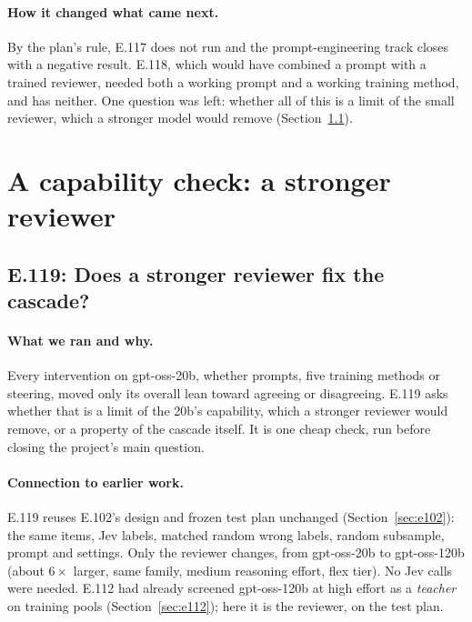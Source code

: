 \documentclass[11pt]{article}
\renewcommand{\_}{\origunderscore\allowbreak}
\begin{document}
\paragraph{How it changed what came next.}
By the plan's rule, E.117 does not run and the prompt-engineering track closes with a negative result. E.118, which would have combined a prompt with a trained reviewer, needed both a working prompt and a working training method, and has neither. One question was left: whether all of this is a limit of the small reviewer, which a stronger model would remove (Section~\ref{sec:e119}).

\section{A capability check: a stronger reviewer}\label{sec:capability}

\subsection{E.119: Does a stronger reviewer fix the cascade?}\label{sec:e119}

\paragraph{What we ran and why.}
Every intervention on gpt-oss-20b, whether prompts, five training methods or steering, moved only its overall lean toward agreeing or disagreeing. E.119 asks whether that is a limit of the 20b's capability, which a stronger reviewer would remove, or a property of the cascade itself. It is one cheap check, run before closing the project's main question.

\paragraph{Connection to earlier work.}
E.119 reuses E.102's design and frozen test plan unchanged (Section~\ref{sec:e102}): the same items, Jev labels, matched random wrong labels, random subsample, prompt and settings. Only the reviewer changes, from gpt-oss-20b to gpt-oss-120b (about $6\times$ larger, same family, medium reasoning effort, flex tier). No Jev calls were needed. E.112 had already screened gpt-oss-120b at high effort as a \emph{teacher} on training pools (Section~\ref{sec:e112}); here it is the reviewer, on the test plan.
\end{document}
